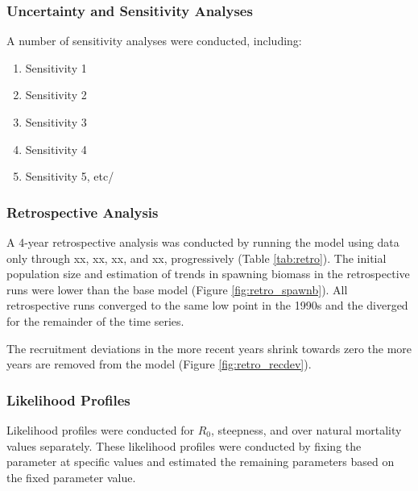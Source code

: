 \documentclass[12pt,]{article}
\begin{document}
\subsubsection{Uncertainty and Sensitivity
Analyses}\label{uncertainty-and-sensitivity-analyses}

A number of sensitivity analyses were conducted, including:

\begin{enumerate}

  \item Sensitivity 1
  
  \item Sensitivity 2
  
  \item Sensitivity 3
  
  \item Sensitivity 4
  
  \item Sensitivity 5, etc/
  
  
\end{enumerate}

\subsubsection{Retrospective Analysis}\label{retrospective-analysis}

A 4-year retrospective analysis was conducted by running the model using
data only through xx, xx, xx, and xx, progressively (Table
\ref{tab:retro}). The initial population size and estimation of trends
in spawning biomass in the retrospective runs were lower than the base
model (Figure \ref{fig:retro_spawnb}). All retrospective runs converged
to the same low point in the 1990s and the diverged for the remainder of
the time series.

The recruitment deviations in the more recent years shrink towards zero
the more years are removed from the model (Figure
\ref{fig:retro_recdev}).

\subsubsection{Likelihood Profiles}\label{likelihood-profiles}

Likelihood profiles were conducted for \(R_0\), steepness, and over
natural mortality values separately. These likelihood profiles were
conducted by fixing the parameter at specific values and estimated the
remaining parameters based on the fixed parameter value.
\end{document}

